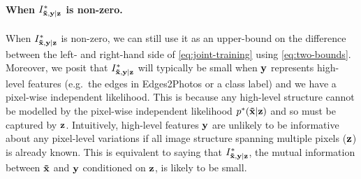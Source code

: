 

\paragraph{When $I^*_{\mathbf{\tilde{x}}{},\mathbf{y}{}|\mathbf{z}{}}{}$ is non-zero.}
When $I^*_{\mathbf{\tilde{x}}{},\mathbf{y}{}|\mathbf{z}{}}{}$ is non-zero, we can still use it as an upper-bound on the
difference between the left- and right-hand side of \cref{eq:joint-training}
using \cref{eq:two-bounds}.
%
Moreover, we posit that $I^*_{\mathbf{\tilde{x}}{},\mathbf{y}{}|\mathbf{z}{}}{}$ will typically be small when $\mathbf{y}{}$
represents high-level features (e.g.~the edges in Edges2Photos or a class label)
and we have a pixel-wise independent likelihood. This is because any high-level
structure cannot be modelled by the pixel-wise independent likelihood
${p}^*{}(\mathbf{\tilde{x}}{}|\mathbf{z}{})$ and so must be captured by $\mathbf{z}{}$. Intuitively, high-level
features $\mathbf{y}{}$ are unlikely to be informative about any pixel-level
variations if all image structure spanning multiple pixels ($\mathbf{z}{}$) is already
known. This is equivalent to saying that $I^*_{\mathbf{\tilde{x}}{},\mathbf{y}{}|\mathbf{z}{}}{}$, the mutual information
between $\mathbf{\tilde{x}}{}$ and $\mathbf{y}{}$ conditioned on $\mathbf{z}{}$, is likely to be small.

